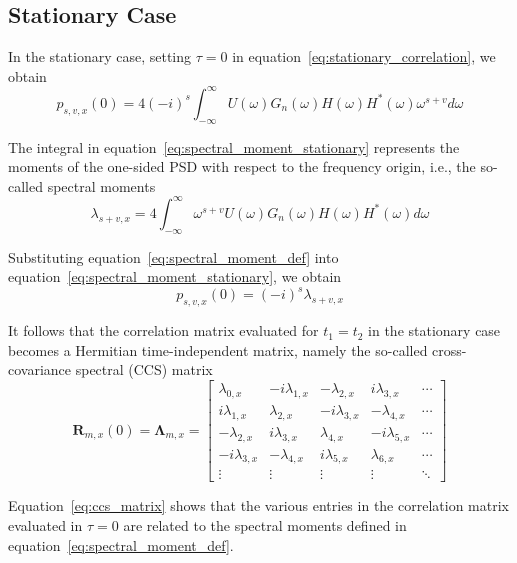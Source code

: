 \documentclass[11pt]{article}
\begin{document}
\subsection{Stationary Case}
\label{sec:spectral_stationary}

In the stationary case, setting $\tau = 0$ in equation~\eqref{eq:stationary_correlation}, we obtain
\begin{equation}
p_{s,v,x}(0) = 4(-i)^s \int_{-\infty}^{\infty} U(\omega) G_n(\omega) H(\omega) H^*(\omega) \omega^{s+v} d\omega
\label{eq:spectral_moment_stationary}
\end{equation}

The integral in equation~\eqref{eq:spectral_moment_stationary} represents the moments of the one-sided PSD with respect to the frequency origin, i.e., the so-called spectral moments \cite{vanmarcke1972}
\begin{equation}
\lambda_{s+v,x} = 4 \int_{-\infty}^{\infty} \omega^{s+v} U(\omega) G_n(\omega) H(\omega) H^*(\omega) d\omega
\label{eq:spectral_moment_def}
\end{equation}

Substituting equation~\eqref{eq:spectral_moment_def} into equation~\eqref{eq:spectral_moment_stationary}, we obtain
\begin{equation}
p_{s,v,x}(0) = (-i)^s \lambda_{s+v,x}
\label{eq:spectral_moment_relation}
\end{equation}

It follows that the correlation matrix evaluated for $t_1 = t_2$ in the stationary case becomes a Hermitian time-independent matrix, namely the so-called cross-covariance spectral (CCS) matrix \cite{borino1988}
\begin{equation}
\mathbf{R}_{m,x}(0) = \boldsymbol{\Lambda}_{m,x} = \begin{bmatrix}
\lambda_{0,x} & -i\lambda_{1,x} & -\lambda_{2,x} & i\lambda_{3,x} & \cdots \\
i\lambda_{1,x} & \lambda_{2,x} & -i\lambda_{3,x} & -\lambda_{4,x} & \cdots \\
-\lambda_{2,x} & i\lambda_{3,x} & \lambda_{4,x} & -i\lambda_{5,x} & \cdots \\
-i\lambda_{3,x} & -\lambda_{4,x} & i\lambda_{5,x} & \lambda_{6,x} & \cdots \\
\vdots & \vdots & \vdots & \vdots & \ddots
\end{bmatrix}
\label{eq:ccs_matrix}
\end{equation}

Equation~\eqref{eq:ccs_matrix} shows that the various entries in the correlation matrix evaluated in $\tau = 0$ are related to the spectral moments defined in equation~\eqref{eq:spectral_moment_def}.
\end{document}
